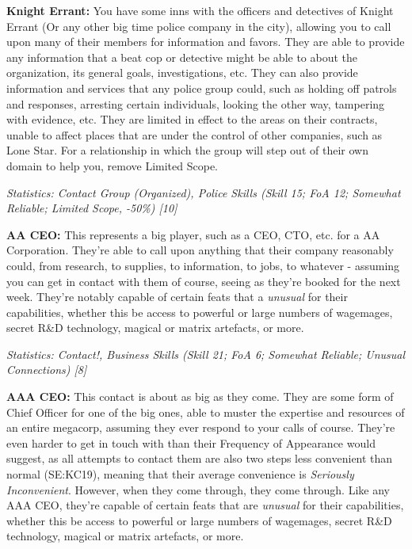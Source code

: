 \begin{multicols*}{2}
	\textbf{Knight Errant:} You have some inns with the officers and detectives of Knight Errant (Or any other big time police company in the city), allowing you to call upon many of their members for information and favors. They are able to provide any information that a beat cop or detective might be able to about the organization, its general goals, investigations, etc. They can also provide information and services that any police group could, such as holding off patrols and responses, arresting certain individuals, looking the other way, tampering with evidence, etc. They are limited in effect to the areas on their contracts, unable to affect places that are under the control of other companies, such as Lone Star. For a relationship in which the group will step out of their own domain to help you, remove Limited Scope.
	
	\textit{\textcolor{OliveGreen}{Statistics: Contact Group (Organized), Police Skills (Skill 15; FoA 12; Somewhat Reliable; Limited Scope, -50\%) [10]}}
	
	\textbf{AA CEO:} This represents a big player, such as a CEO, CTO, etc. for a AA Corporation. They're able to call upon anything that their company reasonably could, from research, to supplies, to information, to jobs, to whatever - assuming you can get in contact with them of course, seeing as they're booked for the next week. They're notably capable of certain feats that a \textit{unusual} for their capabilities, whether this be access to powerful or large numbers of wagemages, secret R\&D technology, magical or matrix artefacts, or more.
	
	\textit{\textcolor{OliveGreen}{Statistics: Contact!, Business Skills (Skill 21; FoA 6; Somewhat Reliable; Unusual Connections) [8]}}
	
	\textbf{AAA CEO:} This contact is about as big as they come. They are some form of Chief Officer for one of the big ones, able to muster the expertise and resources of an entire megacorp, assuming they ever respond to your calls of course. They're even harder to get in touch with than their Frequency of Appearance would suggest, as all attempts to contact them are also two steps less convenient than normal (SE:KC19), meaning that their average convenience is \textit{Seriously Inconvenient}. However, when they come through, they come through. Like any AAA CEO, they're capable of certain feats that are \textit{unusual} for their capabilities, whether this be access to powerful or large numbers of wagemages, secret R\&D technology, magical or matrix artefacts, or more.
	

\end{multicols*}
